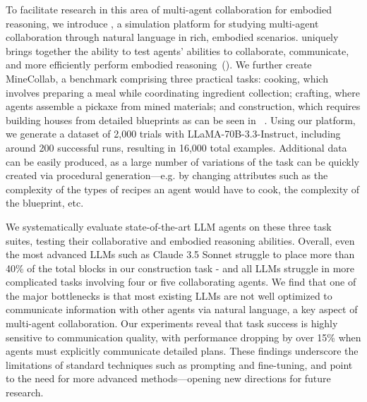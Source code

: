 To facilitate research in this area of multi-agent collaboration for embodied reasoning, we introduce \mindcraft{}, a simulation platform for studying multi-agent collaboration through natural language in rich, embodied scenarios. 
\mindcraft{} uniquely brings together the ability to test agents' abilities to collaborate, communicate, and more efficiently perform embodied reasoning~().
We further create MineCollab, a benchmark comprising three practical tasks: cooking, which involves preparing a meal while coordinating ingredient collection; crafting, where agents assemble a pickaxe from mined materials; and construction, which requires building houses from detailed blueprints as can be seen in ~.
Using our platform,  we generate a dataset of 2,000 trials with LLaMA-70B-3.3-Instruct, including around 200 successful runs, resulting in 16,000 total examples. 
Additional data can be easily produced, as a large number of variations of the task can be quickly created via procedural generation---e.g. by changing attributes such as the complexity of the types of recipes an agent would have to cook, the complexity of the blueprint, etc.

We systematically evaluate state-of-the-art LLM agents on these three task suites, testing their collaborative and embodied reasoning abilities. 
Overall, even the most advanced LLMs such as Claude 3.5 Sonnet struggle to place more than 40\% of the total blocks in our construction task - and all LLMs struggle in more complicated tasks involving four or five collaborating agents.
We find that one of the major bottlenecks is that most existing LLMs are not well optimized to communicate information with other agents via natural language, a key aspect of multi-agent collaboration.
Our experiments reveal that task success is highly sensitive to communication quality, with performance dropping by over 15\% when agents must explicitly communicate detailed plans. 
These findings underscore the limitations of standard techniques such as prompting and fine-tuning, and point to the need for more advanced methods—opening new directions for future research.



























